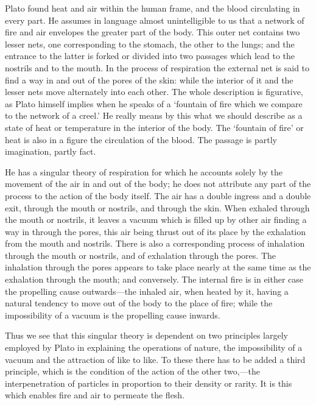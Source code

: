 \documentclass[11pt,letter]{article}
\begin{document}
\par  Plato found heat and air within the human frame, and the blood circulating in every part. He assumes in language almost unintelligible to us that a network of fire and air envelopes the greater part of the body. This outer net contains two lesser nets, one corresponding to the stomach, the other to the lungs; and the entrance to the latter is forked or divided into two passages which lead to the nostrils and to the mouth. In the process of respiration the external net is said to find a way in and out of the pores of the skin: while the interior of it and the lesser nets move alternately into each other. The whole description is figurative, as Plato himself implies when he speaks of a ‘fountain of fire which we compare to the network of a creel.’ He really means by this what we should describe as a state of heat or temperature in the interior of the body. The ‘fountain of fire’ or heat is also in a figure the circulation of the blood. The passage is partly imagination, partly fact.

\par  He has a singular theory of respiration for which he accounts solely by the movement of the air in and out of the body; he does not attribute any part of the process to the action of the body itself. The air has a double ingress and a double exit, through the mouth or nostrils, and through the skin. When exhaled through the mouth or nostrils, it leaves a vacuum which is filled up by other air finding a way in through the pores, this air being thrust out of its place by the exhalation from the mouth and nostrils. There is also a corresponding process of inhalation through the mouth or nostrils, and of exhalation through the pores. The inhalation through the pores appears to take place nearly at the same time as the exhalation through the mouth; and conversely. The internal fire is in either case the propelling cause outwards—the inhaled air, when heated by it, having a natural tendency to move out of the body to the place of fire; while the impossibility of a vacuum is the propelling cause inwards.

\par  Thus we see that this singular theory is dependent on two principles largely employed by Plato in explaining the operations of nature, the impossibility of a vacuum and the attraction of like to like. To these there has to be added a third principle, which is the condition of the action of the other two,—the interpenetration of particles in proportion to their density or rarity. It is this which enables fire and air to permeate the flesh.
\end{document}
